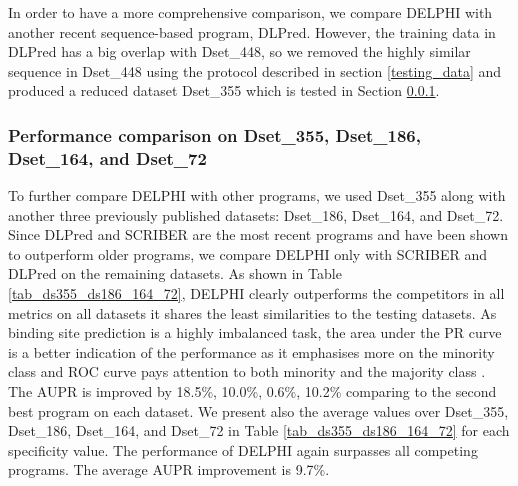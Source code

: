 \documentclass{bioinfo}
\begin{document}
In order to have a more comprehensive comparison, we compare DELPHI with another recent sequence-based program, DLPred. However, the training data in DLPred has a big overlap with Dset\_448, so we removed the highly similar sequence in Dset\_448 using the protocol described in section \ref{testing_data} and produced a reduced dataset Dset\_355 which is tested in Section \ref{section_four_tests}. 

\subsubsection{Performance comparison on Dset\_355, Dset\_186, Dset\_164, and Dset\_72}\label{section_four_tests}
To further compare DELPHI with other programs, we used Dset\_355 along with another three previously published datasets: Dset\_186, Dset\_164, and Dset\_72. Since DLPred and SCRIBER are the most recent programs and have been shown to outperform older programs, we compare DELPHI only with SCRIBER and DLPred on the remaining datasets. As shown in Table \ref{tab_ds355_ds186_164_72}, DELPHI clearly outperforms the competitors in all metrics on all datasets it shares the least similarities to the testing datasets. As binding site prediction is a highly imbalanced task, the area under the PR curve is a better indication of the performance as it emphasises more on the minority class and ROC curve pays attention to both minority and the majority class \citep{andluis2016survey}. The AUPR is improved by 18.5\%, 10.0\%, 0.6\%, 10.2\% comparing to the second best program on each dataset. We present also the average values over Dset\_355, Dset\_186, Dset\_164, and Dset\_72 in Table \ref{tab_ds355_ds186_164_72} for each specificity value. The performance of DELPHI again surpasses all competing programs. The average AUPR improvement is 9.7\%.  
\end{document}
